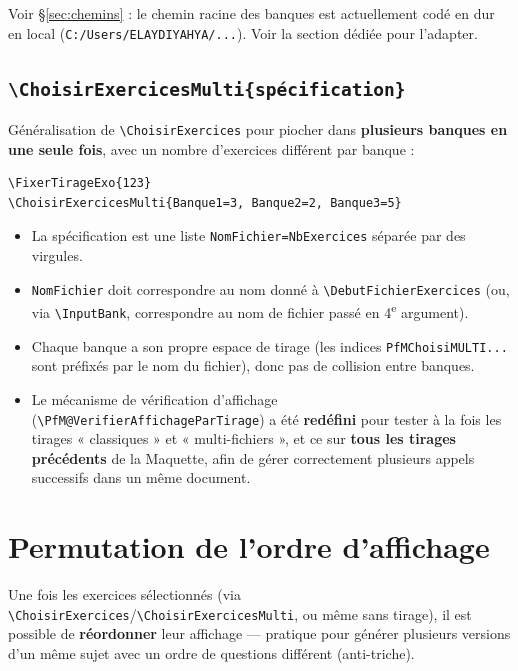 \documentclass[11pt,a4paper]{article}
\newcommand{\cmdname}[1]{\texttt{\textbackslash#1}}
\begin{document}
\begin{avertissement}
Voir \S\ref{sec:chemins} : le chemin racine des banques est actuellement codé en dur en local (\texttt{C:/Users/ELAYDIYAHYA/...}). Voir la section dédiée pour l'adapter.
\end{avertissement}

\subsection{\cmdname{ChoisirExercicesMulti\{spécification\}}}

Généralisation de \cmdname{ChoisirExercices} pour piocher dans \textbf{plusieurs banques en une seule fois}, avec un nombre d'exercices différent par banque :

\begin{lstlisting}
\FixerTirageExo{123}
\ChoisirExercicesMulti{Banque1=3, Banque2=2, Banque3=5}
\end{lstlisting}

\begin{itemize}
  \item La spécification est une liste \texttt{NomFichier=NbExercices} séparée par des virgules.
  \item \texttt{NomFichier} doit correspondre au nom donné à \cmdname{DebutFichierExercices} (ou, via \cmdname{InputBank}, correspondre au nom de fichier passé en 4\textsuperscript{e} argument).
  \item Chaque banque a son propre espace de tirage (les indices \texttt{PfMChoisiMULTI...} sont préfixés par le nom du fichier), donc pas de collision entre banques.
  \item Le mécanisme de vérification d'affichage (\texttt{\textbackslash PfM@VerifierAffichageParTirage}) a été \textbf{redéfini} pour tester à la fois les tirages « classiques » et « multi-fichiers », et ce sur \textbf{tous les tirages précédents} de la Maquette, afin de gérer correctement plusieurs appels successifs dans un même document.
\end{itemize}

\section{Permutation de l'ordre d'affichage}
\label{sec:permutation}

Une fois les exercices sélectionnés (via \cmdname{ChoisirExercices}/\cmdname{ChoisirExercicesMulti}, ou même sans tirage), il est possible de \textbf{réordonner} leur affichage — pratique pour générer plusieurs versions d'un même sujet avec un ordre de questions différent (anti-triche).
\end{document}
